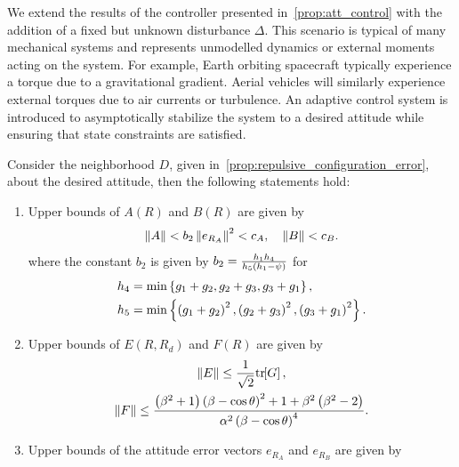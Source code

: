 We extend the results of the controller presented in~\cref{prop:att_control} with the addition of a fixed but unknown disturbance \( \Delta \).
This scenario is typical of many mechanical systems and represents unmodelled dynamics or external moments acting on the system.
For example, Earth orbiting spacecraft typically experience a torque due to a gravitational gradient.
Aerial vehicles will similarly experience external torques due to air currents or turbulence.
An adaptive control system is introduced to asymptotically stabilize the system to a desired attitude while ensuring that state constraints are satisfied. %
\begin{prop}\label{prop:eR_dot_bound}
Consider the neighborhood \( D \), given in~\cref{prop:repulsive_configuration_error}, about the desired attitude, then the following statements hold:
\begin{enumerate}
    \item \label{item:prop_eR_dot_bound_AB} Upper bounds of \( A(R) \) and \( B(R) \) are given by
        \begin{gather}
            \left\| A \right\| < b_2 \left\| e_{R_A} \right\|^2 < c_A  , \quad \left\| B \right\| < c_B. \label{eqn:AB_bound}
        \end{gather}
        where the constant \( b_2\) is given by \( b_2 = \frac{h_1 h_4}{h_5 \left( h_1 - \psi \right)}\) for
        \begin{align*}
            h_4 &= \min\left\{ g_1 + g_2, g_2 + g_3 , g_3 + g_1 \right\} ,\\
            h_5 &= \min\left\{ \left( g_1 + g_2 \right)^2,\left( g_2 + g_3 \right)^2 , \left( g_3 + g_1 \right)^2 \right\}.\\
        \end{align*}
    \item \label{item:prop_eR_dot_bound_EF} Upper bounds of \( E(R,R_d) \) and \( F(R) \) are given by
        \begin{gather}
            \left\| E \right\| \leq \frac{1}{\sqrt{2}} \mathrm{tr}\negthickspace\left[ G \right]  , \label{eqn:E_bound} \\
            \left\| F \right\| \leq \frac{\left( \beta^2 + 1 \right)\left( \beta - \cos \theta \right)^2 + 1 + \beta^2 \left( \beta^2-2 \right)}{\alpha^2 \left( \beta-\cos \theta \right)^4}. \label{eqn:F_bound}
        \end{gather}
    \item Upper bounds of the attitude error vectors \( e_{R_A} \) and \( e_{R_B} \) are given by

\end{enumerate}
\end{prop}
